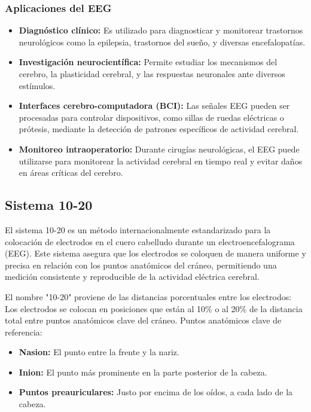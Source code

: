 \documentclass{article}
\begin{document}
\subsubsection{Aplicaciones del EEG}
\begin{itemize}
    \item \textbf{Diagnóstico clínico:} Es utilizado para diagnosticar y monitorear trastornos neurológicos como la epilepsia, trastornos del sueño, y diversas encefalopatías.
    \item \textbf{Investigación neurocientífica:} Permite estudiar los mecanismos del cerebro, la plasticidad cerebral, y las respuestas neuronales ante diversos estímulos.
    \item \textbf{Interfaces cerebro-computadora (BCI):} Las señales EEG pueden ser procesadas para controlar dispositivos, como sillas de ruedas eléctricas o prótesis, mediante la detección de patrones específicos de actividad cerebral.
    \item \textbf{Monitoreo intraoperatorio:} Durante cirugías neurológicas, el EEG puede utilizarse para monitorear la actividad cerebral en tiempo real y evitar daños en áreas críticas del cerebro.
\end{itemize}

\subsection{Sistema 10-20}

El sistema 10-20 es un método internacionalmente estandarizado para la colocación de electrodos en el cuero cabelludo durante un electroencefalograma (EEG). Este sistema asegura que los electrodos se coloquen de manera uniforme y precisa en relación con los puntos anatómicos del cráneo, permitiendo una medición consistente y reproducible de la actividad eléctrica cerebral.

El nombre "10-20" proviene de las distancias porcentuales entre los electrodos: Los electrodos se colocan en posiciones que están al 10\% o al 20\% de la distancia total entre puntos anatómicos clave del cráneo.
Puntos anatómicos clave de referencia:
\begin{itemize}
    \item \textbf{Nasion:} El punto entre la frente y la nariz.
    \item \textbf{Inion:} El punto más prominente en la parte posterior de la cabeza.
    \item \textbf{Puntos preauriculares:} Justo por encima de los oídos, a cada lado de la cabeza.
\end{itemize}
\end{document}
